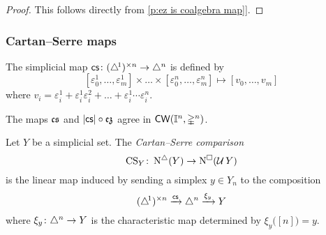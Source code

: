 \begin{proof}
	This follows directly from \cref{p:ez is coalgebra map]}.
\end{proof}

%

\subsubsection{Cartan--Serre maps}

\begin{definition}
	The simplicial map $\operatorname{\mathsf{cs}} \colon (\triangle^{\!1})^{\times n} \to \triangle^n$ is defined by
	\[
	[\varepsilon_0^1, \dots, \varepsilon_m^1]
	\times \dots \times
	[\varepsilon_0^n, \dots, \varepsilon_m^n]
	\mapsto
	[v_0, \dots, v_m]
	\]
	where $v_i = \varepsilon_i^1 + \varepsilon_i^1 \varepsilon_i^2 + \dots + \varepsilon_i^1 \dotsm \varepsilon_i^n$.
\end{definition}

\begin{proposition}
	The maps $\operatorname{\mathfrak{cs}}$ and $\lvert\operatorname{\mathsf{cs}}\rvert \circ \operatorname{\mathfrak{ez}}$ agree in $\mathsf{CW}(\mathbb{I}^n, \mathbb{\Delta}^n)$.
\end{proposition}

\begin{definition}
	Let $Y$ be a simplicial set.
	The \textit{Cartan--Serre comparison}
	\[
	\operatorname{CS}_Y \colon \operatorname{N^{\triangle}}(Y) \to \operatorname{N^{\square}}(\operatorname{\mathcal{U}} Y)
	\]
	is the linear map induced by sending a simplex $y \in Y_n$ to the composition
	\[
	(\triangle^{\!1})^{\times n} \xrightarrow{\operatorname{\mathsf{cs}}} \triangle^n \xrightarrow{\xi_y} Y
	\]
	where $\xi_y \colon \triangle^n \to Y$ is the characteristic map determined by $\xi_y \big( [n] \big) = y$.
\end{definition}

